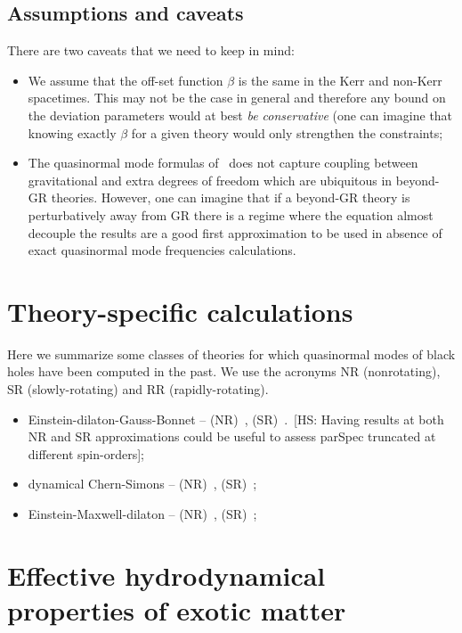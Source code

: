 \documentclass[aps,10pt,preprint,
               notitlepage,onecolumn,superscriptaddress,
               eqsecnum,
               nofootinbib,tightenlines,floatfix]{revtex4-1}
\newcommand{\hs}[1]{{\color{magenta}[HS: #1]}}
\begin{document}
\subsection{Assumptions and caveats}
%
There are two caveats that we need to keep in mind:
%
\begin{itemize}
\item We assume that the off-set function $\beta$ is the same in the Kerr and
non-Kerr spacetimes. This may not be the case in general and therefore any
bound on the deviation parameters would at best \emph{be conservative} (one can
imagine that knowing exactly $\beta$ for a given theory would only strengthen
the constraints;
%
\item The quasinormal mode formulas of~\cite{Glampedakis:2017dvb} does not
capture coupling between gravitational and extra degrees of freedom which
are ubiquitous in beyond-GR theories.
%
However, one can imagine that if a beyond-GR theory is perturbatively away from
GR there is a regime where the equation almost decouple the results are a
good first approximation to be used in absence of exact quasinormal mode
frequencies calculations.
\end{itemize}

\section{Theory-specific calculations}

Here we summarize some classes of theories for which quasinormal modes
of black holes have been computed in the past. We use the acronyms NR (nonrotating),
SR (slowly-rotating) and RR (rapidly-rotating).

\begin{itemize}
    \item Einstein-dilaton-Gauss-Bonnet -- (NR)~\cite{Blazquez-Salcedo:2016enn},
        (SR)~\cite{Pierini:2021jxd}.~\hs{Having results at both NR and SR approximations
        could be useful to assess {\sc parSpec} truncated at different spin-orders};
    \item dynamical Chern-Simons -- (NR)~\cite{Molina:2010fb}, (SR)~\cite{Wagle:2021tam,Srivastava:2021imr};
    \item Einstein-Maxwell-dilaton -- (NR)~\cite{Ferrari:1984zz}, (SR)~\cite{Brito:2018hjh};
\end{itemize}

\section{Effective hydrodynamical properties of exotic matter}
\end{document}

